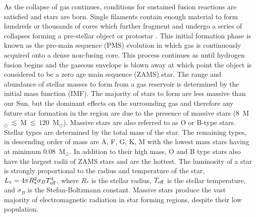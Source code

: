 \documentclass[twoside]{drexel-thesis}
\begin{document}
\begin{thesis}
As the collapse of gas continues, conditions for sustained fusion reactions are satisfied and stars are born. Single filaments contain enough material to form hundreds or thousands of cores which further fragment and undergo a series of collapses forming a pre-stellar object or protostar \citep{larson_stellar_2003,mckee_theory_2007}. This initial formation phase is known as the pre-main sequence (PMS) evolution in which gas is continuously acquired onto a dense non-fusing core. This process continues as until hydrogen fusion begins and the gaseous envelope is blown away at which point the object is considered to be a zero age main sequence (ZAMS) star. The range and abundance of stellar masses to form from a gas reservoir is determined by the initial mass function (IMF). The majority of stars to form are less massive than our Sun, but the dominant effects on the surrounding gas and therefore any future star formation in the region are due to the presence of massive stars ($8$~M$_\odot~\lesssim~$M$~\lesssim~120$~M$_\odot$). Massive stars are also referred to as O or B-type stars. Stellar types are determined by the total mass of the star. The remaining types, in descending order of mass are A, F, G, K, M with the lowest mass stars having at minimum 0.08~M$_\odot$. In addition to their high mass, O and B type stars also have the largest radii of ZAMS stars and are the hottest. The luminosity of a star is strongly proportional to the radius and temperature of the star, $L_{*} = 4\pi R^{2}_{*}\sigma_{B}T^{4}_{\rm eff}$, where $R_{*}$ is the stellar radius, $T_{\rm eff}$ is the stellar temperature, and $\sigma_{B}$ is the Stefan-Boltzmann constant. Massive stars produce the vast majority of electromagnetic radiation in star forming regions, despite their low population.


\end{thesis}
\end{document}
